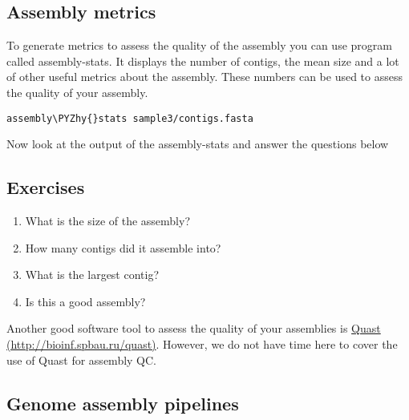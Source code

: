 \documentclass[11pt]{article}
\makeatletter
\providecommand{\tightlist}{%
      \setlength{\itemsep}{0pt}\setlength{\parskip}{0pt}}
\def\PYZhy{\char`\-}
\newcommand{\boxspacing}{\kern\kvtcb@left@rule\kern\kvtcb@boxsep}
\newcommand{\prompt}[4]{
         {\ttfamily\llap{{\color{blue}\LARGE\faKeyboardO\hspace{3pt}#4}}\vspace{-\baselineskip}}
    }
\makeatother
\begin{document}
    \hypertarget{assembly-metrics}{%
\subsection{Assembly metrics}\label{assembly-metrics}}

To generate metrics to assess the quality of the assembly you can use
program called assembly-stats. It displays the number of contigs, the
mean size and a lot of other useful metrics about the assembly. These
numbers can be used to assess the quality of your assembly.

    \begin{tcolorbox}[breakable, size=fbox, boxrule=1pt, pad at break*=1mm,colback=cellbackground, colframe=cellborder]
\prompt{In}{incolor}{ }{\boxspacing}
\begin{Verbatim}[commandchars=\\\{\}]
assembly\PYZhy{}stats sample3/contigs.fasta
\end{Verbatim}
\end{tcolorbox}

    Now look at the output of the assembly-stats and answer the questions
below

    \hypertarget{exercises}{%
\subsection{Exercises}\label{exercises}}

\begin{enumerate}
\def\labelenumi{\arabic{enumi}.}
\tightlist
\item
  What is the size of the assembly?
\item
  How many contigs did it assemble into?
\item
  What is the largest contig?
\item
  Is this a good assembly?
\end{enumerate}

    Another good software tool to assess the quality of your assemblies is
\href{http://bioinf.spbau.ru/quast}{Quast
(http://bioinf.spbau.ru/quast)}. However, we do not have time here to
cover the use of Quast for assembly QC.

    \hypertarget{genome-assembly-pipelines}{%
\subsection{Genome assembly pipelines}\label{genome-assembly-pipelines}}
\end{document}
